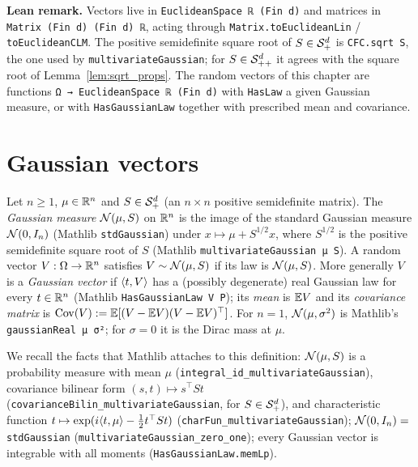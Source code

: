 \textbf{Lean remark.} Vectors live in \texttt{EuclideanSpace ℝ (Fin d)} and matrices in
\texttt{Matrix (Fin d) (Fin d) ℝ}, acting through \texttt{Matrix.toEuclideanLin} /
\texttt{toEuclideanCLM}. The positive semidefinite square root of $S \in \mathcal{S}_{+}^{d}$ is
\texttt{CFC.sqrt S}, the one used by \texttt{multivariateGaussian}; for $S \in \mathcal{S}_{++}^{d}$ it agrees
with the square root of Lemma~\ref{lem:sqrt_props}. The random vectors of this chapter are
functions \texttt{Ω → EuclideanSpace ℝ (Fin d)} with \texttt{HasLaw} a given Gaussian measure,
or with \texttt{HasGaussianLaw} together with prescribed mean and covariance.

\section{Gaussian vectors}
\label{sec:pre_gaussian_vectors}

\begin{definition}\label{def:pg_gaussian_vector}
Let $n \ge 1$, $\mu \in \mathbb{R}^n$ and $S \in \mathcal{S}_{+}^{d}$ (an $n \times n$ positive semidefinite
matrix). The \emph{Gaussian measure} $\mathcal{N}(\mu, S)$ on $\mathbb{R}^n$ is the image of the standard
Gaussian measure $\mathcal{N}(0, I_n)$ (Mathlib \texttt{stdGaussian}) under
$x \mapsto \mu + S^{1/2}x$, where $S^{1/2}$ is the positive semidefinite square root of $S$
(Mathlib \texttt{multivariateGaussian μ S}). A random vector $V : \Omega \to \mathbb{R}^n$ satisfies
$V \sim \mathcal{N}(\mu, S)$ if its law is $\mathcal{N}(\mu,S)$. More generally $V$ is a
\emph{Gaussian vector} if $\langle t, V \rangle$ has a (possibly degenerate) real Gaussian law for every
$t \in \mathbb{R}^n$ (Mathlib \texttt{HasGaussianLaw V P}); its \emph{mean} is $\mathbb{E} V$ and its
\emph{covariance matrix} is $\operatorname{Cov}(V) := \mathbb{E}[(V - \mathbb{E} V)(V - \mathbb{E} V)^\top]$.
For $n = 1$, $\mathcal{N}(\mu, \sigma^2)$ is Mathlib's \texttt{gaussianReal μ σ²}; for
$\sigma = 0$ it is the Dirac mass at $\mu$.
\end{definition}

We recall the facts that Mathlib attaches to this definition: $\mathcal{N}(\mu,S)$ is a
probability measure with mean $\mu$ (\texttt{integral\_id\_multivariateGaussian}), covariance
bilinear form $(s,t) \mapsto s^\top S t$ (\texttt{covarianceBilin\_multivariateGaussian}, for
$S \in \mathcal{S}_{+}^{d}$), and characteristic function
$t \mapsto \exp(i\langle t, \mu \rangle - \tfrac12 t^\top S t)$ (\texttt{charFun\_multivariateGaussian});
$\mathcal{N}(0, I_n) = $ \texttt{stdGaussian} (\texttt{multivariateGaussian\_zero\_one}); every
Gaussian vector is integrable with all moments (\texttt{HasGaussianLaw.memLp}).

